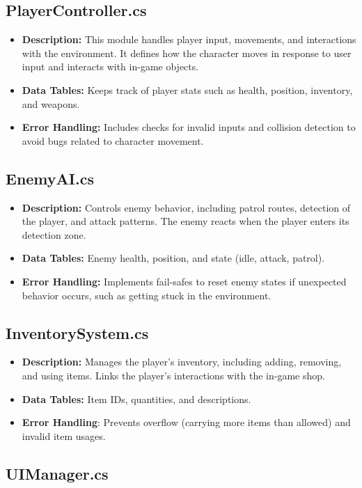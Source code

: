 \subsection{PlayerController.cs}
\begin{itemize}
	\item \textbf{Description:} This module handles player input, movements, and interactions with the environment. 
	It defines how the character moves in response to user input and interacts with in-game objects.
	
	\item \textbf{Data Tables:} Keeps track of player stats such as health, position, inventory, and weapons.
	\item \textbf{Error Handling:} Includes checks for invalid inputs and collision detection to avoid bugs related to character movement.
\end{itemize}
\subsection{EnemyAI.cs}
\begin{itemize}
	\item \textbf{Description:} Controls enemy behavior, including patrol routes, detection of the player, and attack patterns. The enemy reacts when the player enters its detection zone.
	\item \textbf{Data Tables:} Enemy health, position, and state (idle, attack, patrol).
	\item \textbf{Error Handling:} Implements fail-safes to reset enemy states if unexpected behavior occurs, such as getting stuck in the environment.
\end{itemize}
\subsection{InventorySystem.cs}
\begin{itemize}
	\item \textbf{Description:} Manages the player’s inventory, including adding, removing, and using items. Links the player's interactions with the in-game shop.
	\item \textbf{Data Tables:} Item IDs, quantities, and descriptions.
	\item \textbf{Error Handling}: Prevents overflow (carrying more items than allowed) and invalid item usages.
\end{itemize}
\subsection{UIManager.cs}

